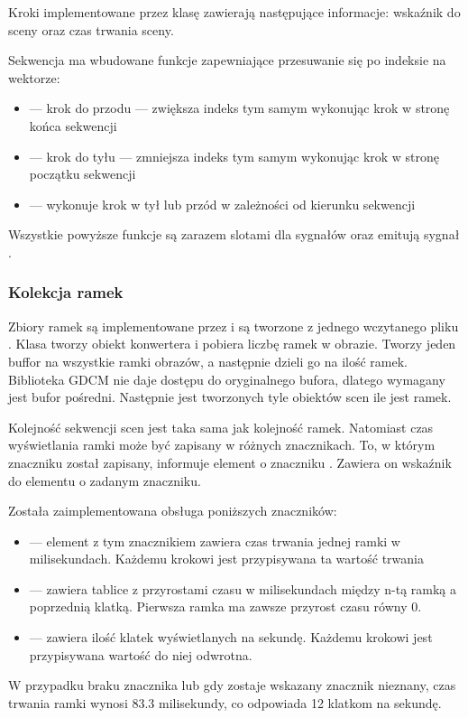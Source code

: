 \par
Kroki implementowane przez klasę  zawierają następujące informacje: wskaźnik do sceny oraz czas trwania sceny.

\par
Sekwencja ma wbudowane funkcje zapewniające przesuwanie się po indeksie na wektorze:
\begin{itemize}
    \item {} --- krok do przodu --- zwiększa indeks tym samym wykonując krok w stronę końca sekwencji
    \item {} --- krok do tyłu --- zmniejsza indeks tym samym wykonując krok w stronę początku sekwencji
    \item {} --- wykonuje krok w tył lub przód w zależności od kierunku sekwencji
\end{itemize}
Wszystkie powyższe funkcje są zarazem slotami dla sygnałów oraz emitują sygnał .

\subsubsection{Kolekcja ramek \DICOM}
\label{sec:sokar-dicomframeset}

\par
Zbiory ramek są implementowane przez  i są tworzone z jednego wczytanego pliku \DICOM.
Klasa tworzy obiekt konwertera i pobiera liczbę ramek w obrazie.
Tworzy jeden buffor na wszystkie ramki obrazów, a następnie dzieli go na ilość ramek.
Biblioteka GDCM nie daje dostępu do oryginalnego bufora, dlatego wymagany jest bufor pośredni.
Następnie jest tworzonych tyle obiektów scen ile jest ramek.
\par
Kolejność sekwencji scen jest taka sama jak kolejność ramek.
Natomiast czas wyświetlania ramki może być zapisany w różnych znacznikach.
To, w którym znaczniku został zapisany, informuje element o znaczniku .
Zawiera on wskaźnik do elementu o zadanym znaczniku.
\par
Została zaimplementowana obsługa poniższych znaczników:
\begin{itemize}
    \item {} --- element z tym znacznikiem zawiera czas trwania jednej ramki w milisekundach.
          Każdemu krokowi jest przypisywana ta wartość trwania

    \item {} --- zawiera tablice z przyrostami czasu w milisekundach między n-tą ramką a poprzednią klatką.
          Pierwsza ramka ma zawsze przyrost czasu równy 0.

    \item {} --- zawiera ilość klatek wyświetlanych na sekundę.
          Każdemu krokowi jest przypisywana wartość do niej odwrotna.
\end{itemize}
W przypadku braku znacznika lub gdy zostaje wskazany znacznik nieznany, czas trwania ramki wynosi $83.3$ milisekundy, co odpowiada 12 klatkom na sekundę.


